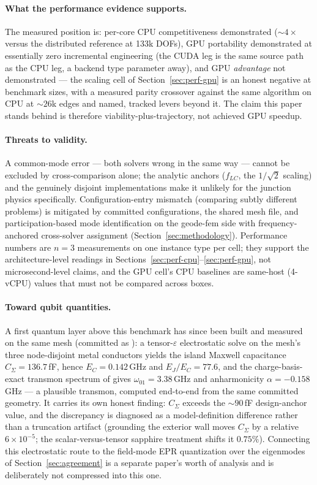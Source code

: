 \documentclass{anvil-paper}
\begin{document}
\paragraph{What the performance evidence supports.}
The measured position is: per-core CPU competitiveness demonstrated
(${\sim}4\times$ versus the distributed reference at 133k DOFs), GPU
portability demonstrated at essentially zero incremental engineering (the
CUDA leg is the same source path as the CPU leg, a backend type parameter
away), and GPU \emph{advantage} not demonstrated --- the scaling cell of
Section~\ref{sec:perf-gpu} is an honest negative at benchmark sizes, with
a measured parity crossover against the same algorithm on CPU at
${\sim}26$k edges and named, tracked levers beyond it. The claim this
paper stands behind is therefore viability-plus-trajectory, not achieved
GPU speedup.

\paragraph{Threats to validity.}
A common-mode error --- both solvers wrong in the same way --- cannot be
excluded by cross-comparison alone; the analytic anchors ($f_{LC}$, the
$1/\sqrt{2}$ scaling) and the genuinely disjoint implementations make it
unlikely for the junction physics specifically. Configuration-entry
mismatch (comparing subtly different problems) is mitigated by committed
configurations, the shared mesh file, and participation-based mode
identification on the geode-fem side with frequency-anchored cross-solver
assignment (Section~\ref{sec:methodology}). Performance numbers are $n = 3$
measurements on one instance type per cell; they support the
architecture-level readings in
Sections~\ref{sec:perf-cpu}--\ref{sec:perf-gpu}, not microsecond-level
claims, and the GPU cell's CPU baselines are same-host (4-vCPU) values
that must not be compared across boxes.

\paragraph{Toward qubit quantities.}
A first quantum layer above this benchmark has since been built and
measured on the same mesh (committed as
): a tensor-$\varepsilon$
electrostatic solve on the mesh's three node-disjoint metal conductors
yields the island Maxwell capacitance $C_\Sigma = 136.7$\,fF, hence
$E_C = 0.142$\,GHz and $E_J/E_C = 77.6$, and the charge-basis-exact
transmon spectrum of \citet{koch2007} gives $\omega_{01} = 3.38$\,GHz and
anharmonicity $\alpha = -0.158$\,GHz --- a plausible transmon, computed
end-to-end from the same committed geometry. It carries its own honest
finding: $C_\Sigma$ exceeds the ${\sim}90$\,fF design-anchor value, and
the discrepancy is diagnosed as a model-definition difference rather than
a truncation artifact (grounding the exterior wall moves $C_\Sigma$ by a
relative $6\times10^{-5}$; the scalar-versus-tensor sapphire treatment
shifts it $0.75\%$). Connecting this electrostatic route to the
field-mode EPR quantization \citep{minev2021,nigg2012} over the
eigenmodes of Section~\ref{sec:agreement} is a separate paper's worth of
analysis and is deliberately not compressed into this one.
\end{document}
